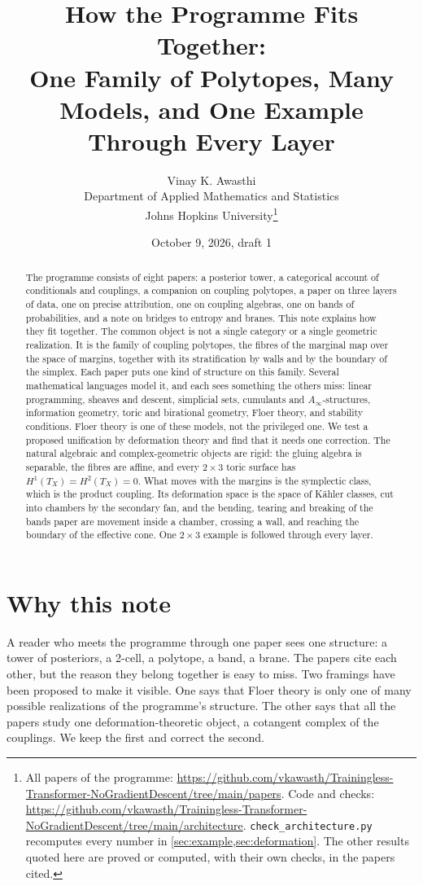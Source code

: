 \documentclass[11pt]{article}
\title{How the Programme Fits Together:\\ One Family of Polytopes, Many Models, and One Example Through Every Layer}
\author{Vinay K. Awasthi\\
Department of Applied Mathematics and Statistics\\
Johns Hopkins University\thanks{All papers of the programme: \url{https://github.com/vkawasth/Trainingless-Transformer-NoGradientDescent/tree/main/papers}. Code and checks: \url{https://github.com/vkawasth/Trainingless-Transformer-NoGradientDescent/tree/main/architecture}. \texttt{check\_architecture.py} recomputes every number in \cref{sec:example,sec:deformation}. The other
results quoted here are proved or computed, with their own checks, in the papers cited.}}
\date{October 9, 2026, draft 1}
\theoremstyle{definition}
\theoremstyle{remark}
\begin{document}
\maketitle

\begin{abstract}
The programme consists of eight papers: a posterior tower, a categorical account of conditionals and couplings, a companion on coupling
polytopes, a paper on three layers of data, one on precise attribution, one on coupling algebras, one on bands of probabilities, and a note
on bridges to entropy and branes. This note explains how they fit together. The common object is not a single category or a single
geometric realization. It is the family of coupling polytopes, the fibres of the marginal map over the space of margins, together with its
stratification by walls and by the boundary of the simplex. Each paper puts one kind of structure on this family. Several mathematical
languages model it, and each sees something the others miss: linear programming, sheaves and descent, simplicial sets, cumulants and
$A_\infty$-structures, information geometry, toric and birational geometry, Floer theory, and stability conditions. Floer theory is one of
these models, not the privileged one. We test a proposed unification by deformation theory and find that it needs one correction. The
natural algebraic and complex-geometric objects are rigid: the gluing algebra is separable, the fibres are affine, and every $2\times3$ toric
surface has $H^1(T_X)=H^2(T_X)=0$. What moves with the margins is the symplectic class, which is the product coupling. Its deformation space
is the space of Kähler classes, cut into chambers by the secondary fan, and the bending, tearing and breaking of the bands paper are
movement inside a chamber, crossing a wall, and reaching the boundary of the effective cone. One $2\times3$ example is followed through every layer.
\end{abstract}

\tableofcontents

\section{Why this note}\label{sec:why}

A reader who meets the programme through one paper sees one structure: a tower of posteriors, a 2-cell, a polytope, a band, a brane. The
papers cite each other, but the reason they belong together is easy to miss. Two framings have been proposed to make it visible. One says
that Floer theory is only one of many possible realizations of the programme's structure. The other says that all the papers study one
deformation-theoretic object, a cotangent complex of the couplings. We keep the first and correct the second.
\end{document}
